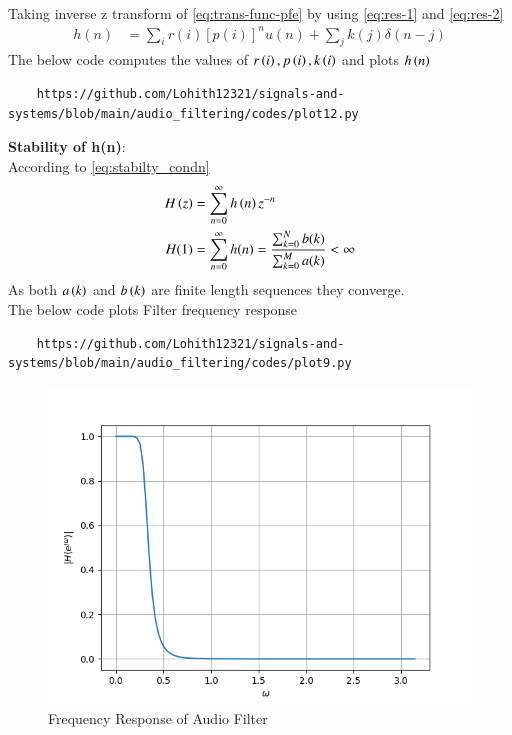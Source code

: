 \documentclass[journal,12pt,twocolumn]{IEEEtran}
\theoremstyle{remark}
\begin{document}
\begin{enumerate}[label=\thesection.\arabic*
,ref=\thesection.\theenumi]
\begin{enumerate}[label=\thesection.\arabic*
,ref=\thesection.\theenumi]
\begin{align}
\end{align}
Taking inverse z transform of \eqref{eq:trans-func-pfe} by using \eqref{eq:res-1} and \eqref{eq:res-2}
\begin{align}
h(n) &= \sum_{i}r(i)[p(i)]^nu(n) + \sum_{j}k(j)\delta(n - j)
	\label{eq:h-n-expr}
\end{align}
The below code computes the values of $r\left(i\right),p\left(i\right) , k\left(i\right)$ and plots $h\left(n\right)$
\begin{lstlisting}
    https://github.com/Lohith12321/signals-and-systems/blob/main/audio_filtering/codes/plot12.py 
\end{lstlisting}

\textbf{Stability of h(n)}:\\
According to \eqref{eq:stabilty_condn}
\begin{align}
H\left(z\right) &= \sum_{n = 0}^{\infty} h\left(n\right)z^{-n}\\
H(1)&= \sum_{n = 0}^{\infty}h(n)  = \frac{\sum_{k = 0}^{N}b(k)}{\sum_{k = 0}^{M}a(k)}< \infty
\end{align}
As both $a\left(k\right)$ and $b\left(k\right)$ are finite length sequences they converge.\\
The below code plots Filter frequency response
\begin{lstlisting}
    https://github.com/Lohith12321/signals-and-systems/blob/main/audio_filtering/codes/plot9.py
\end{lstlisting}
\begin{figure}[ht]
\centering
\includegraphics[width=1\columnwidth]{figs/plot9.png}
\caption{Frequency Response of Audio Filter}
\label{fig:plot9}
\end{figure}

\end{enumerate}
\end{enumerate}
\end{document}
